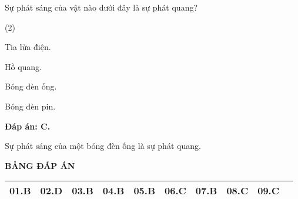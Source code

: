 \begin{enumerate}[label=\bfseries Câu \arabic*:]
	\cauhoi
	{Sự phát sáng của vật nào dưới đây là sự phát quang?
	}
	
	\loigiai
	{		\textbf{Đáp án: C.}
		
Sự phát sáng của một bóng đèn ống là sự phát quang.
		
	}
	

	
\end{enumerate}

\loigiai
{
	\begin{center}
		\textbf{BẢNG ĐÁP ÁN}
	\end{center}
	\begin{center}
		\begin{tabular}{|m{2.8em}|m{2.8em}|m{2.8em}|m{2.8em}|m{2.8em}|m{2.8em}|m{2.8em}|m{2.8em}|m{2.8em}|m{2.8em}|}
			\hline
			01.B  & 02.D  & 03.B  & 04.B  & 05.B  & 06.C  & 07.B & 08.C & 09.C & \\
			\hline
			
		\end{tabular}
	\end{center}
}

